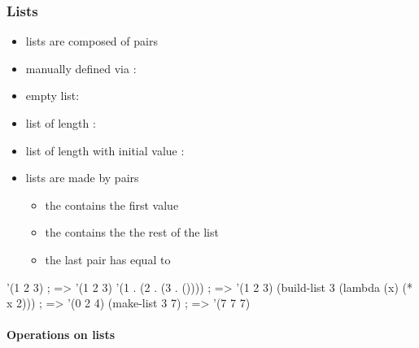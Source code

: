 \documentclass[a4paper,landscape,10pt]{article}
\begin{document}
\begin{multicols*}{2}
  \breakcolumn

  \subsubsection{Lists}

  \begin{itemize}
    \item lists are composed of pairs
    \item manually defined via : 
    \item empty list: 
    \item list of length : 
    \item list of length  with initial value : 
    \item lists are made by pairs
          \begin{itemize} \item the  contains the first value
            \item the  contains the the rest of the list
            \item the last pair has  equal to 
          \end{itemize}
  \end{itemize}

  \begin{racket}
'(1 2 3) ; => '(1 2 3)
'(1 . (2 . (3 . ()))) ; => '(1 2 3)
(build-list 3 (lambda (x) (* x 2))) ; => '(0 2 4)
(make-list 3 7) ; => '(7 7 7)
\end{racket}

  \paragraph{Operations on lists}


\end{multicols*}
\end{document}
